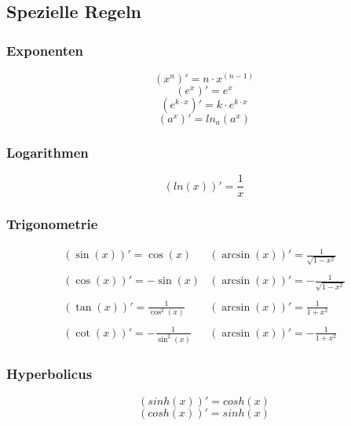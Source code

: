 \newpage

\subsection{Spezielle Regeln}

\subsubsection{Exponenten}
\[ \boxed{ (x^n)' = n\cdot x^{(n-1)} } \]
\[ \boxed{ (e^x)' = e^x } \]
\[ \boxed{ (e^{k\cdot x})' = k \cdot e^{k\cdot x} } \]
\[ \boxed{ (a^x)' = ln_a (a^x) } \]

\subsubsection{Logarithmen}
\[ \boxed{ (ln(x))' = \frac{1}{x} } \]  

\subsubsection{Trigonometrie}

\[ \boxed{ \begin{matrix}
(\sin(x))' = \cos(x)              & (\arcsin(x))' = \frac{1}{\sqrt{1 - x^2}} \\\\
(\cos(x))' = -\sin(x)             & (\arcsin(x))' = -\frac{1}{\sqrt{1 - x^2}} \\\\
(\tan(x))' = \frac{1}{\cos^2(x)}  & (\arcsin(x))' = \frac{1}{1 + x^2} \\\\
(\cot(x))' = -\frac{1}{\sin^2(x)} & (\arcsin(x))' = -\frac{1}{1 + x^2} 
\end{matrix}} \]

\subsubsection{Hyperbolicus}
\[ \boxed{(sinh(x))' = cosh(x)} \]
\[ \boxed{(cosh(x))' = sinh(x)} \]

